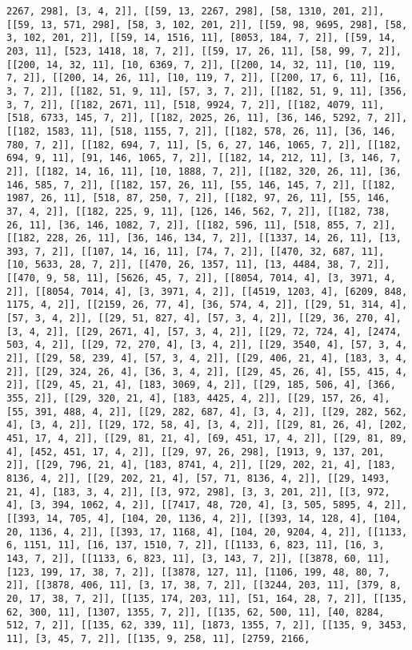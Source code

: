 \documentclass[12pt,fleqn]{article}\usepackage{../../common}
\begin{document}
\begin{verbatim}
2267, 298], [3, 4, 2]], [[59, 13, 2267, 298], [58, 1310, 201, 2]], [[59, 13, 571, 298], [58, 3, 102, 201, 2]], [[59, 98, 9695, 298], [58, 3, 102, 201, 2]], [[59, 14, 1516, 11], [8053, 184, 7, 2]], [[59, 14, 203, 11], [523, 1418, 18, 7, 2]], [[59, 17, 26, 11], [58, 99, 7, 2]], [[200, 14, 32, 11], [10, 6369, 7, 2]], [[200, 14, 32, 11], [10, 119, 7, 2]], [[200, 14, 26, 11], [10, 119, 7, 2]], [[200, 17, 6, 11], [16, 3, 7, 2]], [[182, 51, 9, 11], [57, 3, 7, 2]], [[182, 51, 9, 11], [356, 3, 7, 2]], [[182, 2671, 11], [518, 9924, 7, 2]], [[182, 4079, 11], [518, 6733, 145, 7, 2]], [[182, 2025, 26, 11], [36, 146, 5292, 7, 2]], [[182, 1583, 11], [518, 1155, 7, 2]], [[182, 578, 26, 11], [36, 146, 780, 7, 2]], [[182, 694, 7, 11], [5, 6, 27, 146, 1065, 7, 2]], [[182, 694, 9, 11], [91, 146, 1065, 7, 2]], [[182, 14, 212, 11], [3, 146, 7, 2]], [[182, 14, 16, 11], [10, 1888, 7, 2]], [[182, 320, 26, 11], [36, 146, 585, 7, 2]], [[182, 157, 26, 11], [55, 146, 145, 7, 2]], [[182, 1987, 26, 11], [518, 87, 250, 7, 2]], [[182, 97, 26, 11], [55, 146, 37, 4, 2]], [[182, 225, 9, 11], [126, 146, 562, 7, 2]], [[182, 738, 26, 11], [36, 146, 1082, 7, 2]], [[182, 596, 11], [518, 855, 7, 2]], [[182, 228, 26, 11], [36, 146, 134, 7, 2]], [[1337, 14, 26, 11], [13, 393, 7, 2]], [[107, 14, 16, 11], [74, 7, 2]], [[470, 32, 687, 11], [10, 5633, 28, 7, 2]], [[470, 26, 1357, 11], [13, 4484, 38, 7, 2]], [[470, 9, 58, 11], [5626, 45, 7, 2]], [[8054, 7014, 4], [3, 3971, 4, 2]], [[8054, 7014, 4], [3, 3971, 4, 2]], [[4519, 1203, 4], [6209, 848, 1175, 4, 2]], [[2159, 26, 77, 4], [36, 574, 4, 2]], [[29, 51, 314, 4], [57, 3, 4, 2]], [[29, 51, 827, 4], [57, 3, 4, 2]], [[29, 36, 270, 4], [3, 4, 2]], [[29, 2671, 4], [57, 3, 4, 2]], [[29, 72, 724, 4], [2474, 503, 4, 2]], [[29, 72, 270, 4], [3, 4, 2]], [[29, 3540, 4], [57, 3, 4, 2]], [[29, 58, 239, 4], [57, 3, 4, 2]], [[29, 406, 21, 4], [183, 3, 4, 2]], [[29, 324, 26, 4], [36, 3, 4, 2]], [[29, 45, 26, 4], [55, 415, 4, 2]], [[29, 45, 21, 4], [183, 3069, 4, 2]], [[29, 185, 506, 4], [366, 355, 2]], [[29, 320, 21, 4], [183, 4425, 4, 2]], [[29, 157, 26, 4], [55, 391, 488, 4, 2]], [[29, 282, 687, 4], [3, 4, 2]], [[29, 282, 562, 4], [3, 4, 2]], [[29, 172, 58, 4], [3, 4, 2]], [[29, 81, 26, 4], [202, 451, 17, 4, 2]], [[29, 81, 21, 4], [69, 451, 17, 4, 2]], [[29, 81, 89, 4], [452, 451, 17, 4, 2]], [[29, 97, 26, 298], [1913, 9, 137, 201, 2]], [[29, 796, 21, 4], [183, 8741, 4, 2]], [[29, 202, 21, 4], [183, 8136, 4, 2]], [[29, 202, 21, 4], [57, 71, 8136, 4, 2]], [[29, 1493, 21, 4], [183, 3, 4, 2]], [[3, 972, 298], [3, 3, 201, 2]], [[3, 972, 4], [3, 394, 1062, 4, 2]], [[7417, 48, 720, 4], [3, 505, 5895, 4, 2]], [[393, 14, 705, 4], [104, 20, 1136, 4, 2]], [[393, 14, 128, 4], [104, 20, 1136, 4, 2]], [[393, 17, 1168, 4], [104, 20, 9204, 4, 2]], [[1133, 6, 1151, 11], [16, 137, 1510, 7, 2]], [[1133, 6, 823, 11], [16, 3, 143, 7, 2]], [[1133, 6, 823, 11], [3, 143, 7, 2]], [[3878, 60, 11], [123, 199, 17, 38, 7, 2]], [[3878, 127, 11], [1106, 199, 48, 80, 7, 2]], [[3878, 406, 11], [3, 17, 38, 7, 2]], [[3244, 203, 11], [379, 8, 20, 17, 38, 7, 2]], [[135, 174, 203, 11], [51, 164, 28, 7, 2]], [[135, 62, 300, 11], [1307, 1355, 7, 2]], [[135, 62, 500, 11], [40, 8284, 512, 7, 2]], [[135, 62, 339, 11], [1873, 1355, 7, 2]], [[135, 9, 3453, 11], [3, 45, 7, 2]], [[135, 9, 258, 11], [2759, 2166, 
\end{verbatim}
\end{document}
